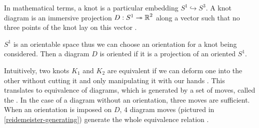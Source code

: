 In mathematical terms, a knot is a particular embedding $S^1\hookrightarrow S^3$. A knot diagram is an {\color{blue}immersive projection} $D:S^1\twoheadrightarrow \operatorname{\mathbb{R}}^2$ along a vector such that no three points of the knot lay on this vector \cite{likorish-diagram}.

$S^1$ is an orientable space thus we can choose an orientation for a knot being considered. Then a diagram $D$ is oriented if it is a projection of an oriented $S^1$.

Intuitively, two knots $K_1$ and $K_2$ are equivalent if we can deform one into the other without cutting it and only manipulating it with our hands \cite{murasagi-equivalence}. This translates to equivalence of diagrams, which is generated by a set of moves, called the . In the case of a diagram without an orientation, three moves are sufficient. When an orientation is imposed on $D$, $4$ diagram moves (pictured in \cref{reidemeister-generating}) generate the whole equivalence relation \cite{ruchy_zorientowane}.

